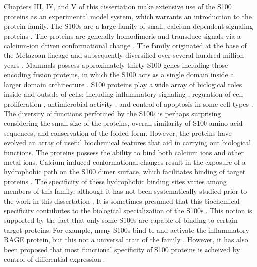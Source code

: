 Chapters III, IV, and V of this dissertation make extensive use of
the S100 proteins as an experimental model system, which warrants
an introduction to the protein family. The S100s are a large family
of small, calcium-dependent signaling proteins \citep{donato_functions_2013,donato_intracellular_2003,zimmer_evolution_2013,heizmann_new_nodate,chazin_relating_2011}.
The proteins are generally homodimeric and transduce signals via a
calcium-ion driven conformational change \citep{santamaria-kisiel_calcium-dependent_2006,donato_functions_2013}.
The family originated at the base of the Metazoan lineage and subsequently
diversified over several hundred million years \citep{kraemer_structural_2008,zimmer_evolution_2013,wheeler_multiple_2016}.
Mammals possess approximately thirty S100 genes including those encoding
fusion proteins, in which the S100 acts as a single domain inside
a larger domain architecture \citep{zimmer_evolution_2013,wheeler_multiple_2016,kizawa_s100_2011,gutknecht_identification_2017,contzler_cornulin_2005}.
S100 proteins play a wide array of biological roles inside and outside
of cells; including inflammatory signaling \citep{marenholz_s100_2004,leclerc_binding_2009},
regulation of cell proliferation \citep{riuzzi_s100b_2011,zhu_s100a16_2016,cho_pentamidine_2016},
antimicrobial activity \citep{damo_molecular_2013,hayden_high-affinity_2013},
and control of apoptosis in some cell types \citep{tsoporis_s100b_2005,tsoporis_expression_2008}.
The diversity of functions performed by the S100s is perhaps surprising
considering the small size of the proteins, overall similarity of
S100 amino acid sequences, and conservation of the folded form. However,
the proteins have evolved an array of useful biochemical features
that aid in carrying out biological functions. The proteins possess
the ability to bind both calcium ions and other metal ions. Calcium-induced
conformational changes result in the exposure of a hydrophobic path
on the S100 dimer surface, which facilitates binding of target proteins
\citep{santamaria-kisiel_calcium-dependent_2006,chazin_relating_2011}.
The specificity of these hydrophobic binding sites varies among members
of this family, although it has not been systematically studied prior
to the work in this dissertation \citep{chazin_relating_2011,wafer_novel_2013}.
It is sometimes presumed that this biochemical specificity contributes
to the biological specialization of the S100s \citep{chazin_relating_2011}.
This notion is supported by the fact that only some S100s are capable
of binding to certain target proteins. For example, many S100s bind
to and activate the inflammatory RAGE protein, but this not a universal
trait of the family \citep{leclerc_binding_2009,cho_pentamidine_2016}.
However, it has also been proposed that most functional specificity
of S100 proteins is acheived by control of differential expression
\citep{donato_functions_2013,donato_intracellular_2003,marenholz_s100_2004}. 

